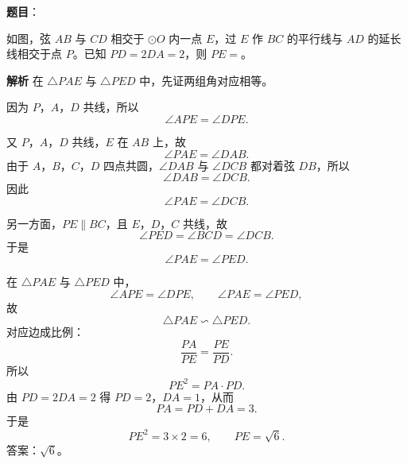 \begin{answer}

\textbf{题目}：

如图，弦 $AB$ 与 $CD$ 相交于 $\odot O$ 内一点 $E$，过 $E$ 作 $BC$ 的平行线与 $AD$ 的延长线相交于点 $P$。已知 $PD=2DA=2$，则 $PE=$\gkblank{}。
\nopagebreak[4]
\begin{center}\end{center}
\nopagebreak[4]
\textbf{解析}
在 $\triangle PAE$ 与 $\triangle PED$ 中，先证两组角对应相等。

因为 $P$，$A$，$D$ 共线，所以
\nopagebreak[4]
\[\angle APE=\angle DPE.\]

又 $P$，$A$，$D$ 共线，$E$ 在 $AB$ 上，故
\nopagebreak[4]
\[\angle PAE=\angle DAB.\]
由于 $A$，$B$，$C$，$D$ 四点共圆，$\angle DAB$ 与 $\angle DCB$ 都对着弦 $DB$，所以
\nopagebreak[4]
\[\angle DAB=\angle DCB.\]
因此
\nopagebreak[4]
\[\angle PAE=\angle DCB.\]

另一方面，$PE\parallel BC$，且 $E$，$D$，$C$ 共线，故
\nopagebreak[4]
\[\angle PED=\angle BCD=\angle DCB.\]
于是
\nopagebreak[4]
\[\angle PAE=\angle PED.\]

在 $\triangle PAE$ 与 $\triangle PED$ 中，
\nopagebreak[4]
\[\angle APE=\angle DPE,\qquad \angle PAE=\angle PED,\]
故
\nopagebreak[4]
\[\triangle PAE\backsim\triangle PED.\]
对应边成比例：
\nopagebreak[4]
\[\frac{PA}{PE}=\frac{PE}{PD}.\]
所以
\nopagebreak[4]
\[PE^2=PA\cdot PD.\]
由 $PD=2DA=2$ 得 $PD=2$，$DA=1$，从而
\nopagebreak[4]
\[PA=PD+DA=3.\]
于是
\nopagebreak[4]
\[PE^2=3\times2=6,\qquad PE=\sqrt6.\]
答案：$\sqrt6$。


\end{answer}

